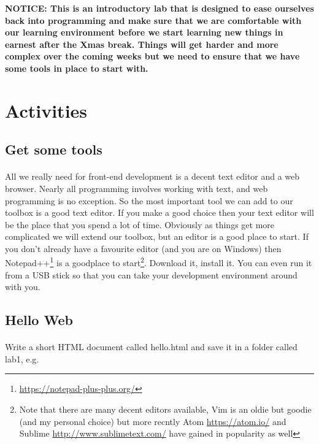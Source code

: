 \documentclass[10pt, a4paper, twosize]{article}
\begin{document}
\begin{framed}
{\bf{NOTICE:} This is an introductory lab that is designed to ease ourselves back into programming and make sure that we are comfortable with our learning environment before we start learning new things in earnest after the Xmas break. Things will get harder and more complex over the coming weeks but we need to ensure that we have some tools in place to start with.}  
\end{framed}


\section{Activities}

\subsection{Get some tools}

\paragraph{} All we really need for front-end development is a decent text editor and a web browser. Nearly all programming involves working with text, and web programming is no exception. So the most important tool we can add to our toolbox is a good text editor. If you make a good choice then your text editor will be the place that you spend a lot of time. Obviously as things get more complicated we will extend our toolbox, but an editor is a good place to start. If you don't already have a favourite editor (and you are on Windows) then Notepad++\footnote{\url{https://notepad-plus-plus.org/}} is a goodplace to start\footnote{Note that there are many decent editors available, Vim is an oldie but goodie (and my personal choice) but more recntly Atom \url{https://atom.io/} and Sublime \url{http://www.sublimetext.com/} have gained in popularity as well}. Download it, install it. You can even run it from a USB stick so that you can take your development environment around with you.

\subsection{Hello Web}

\paragraph{} Write a short HTML document called hello.html and save it in a folder called lab1, e.g.
\end{document}
